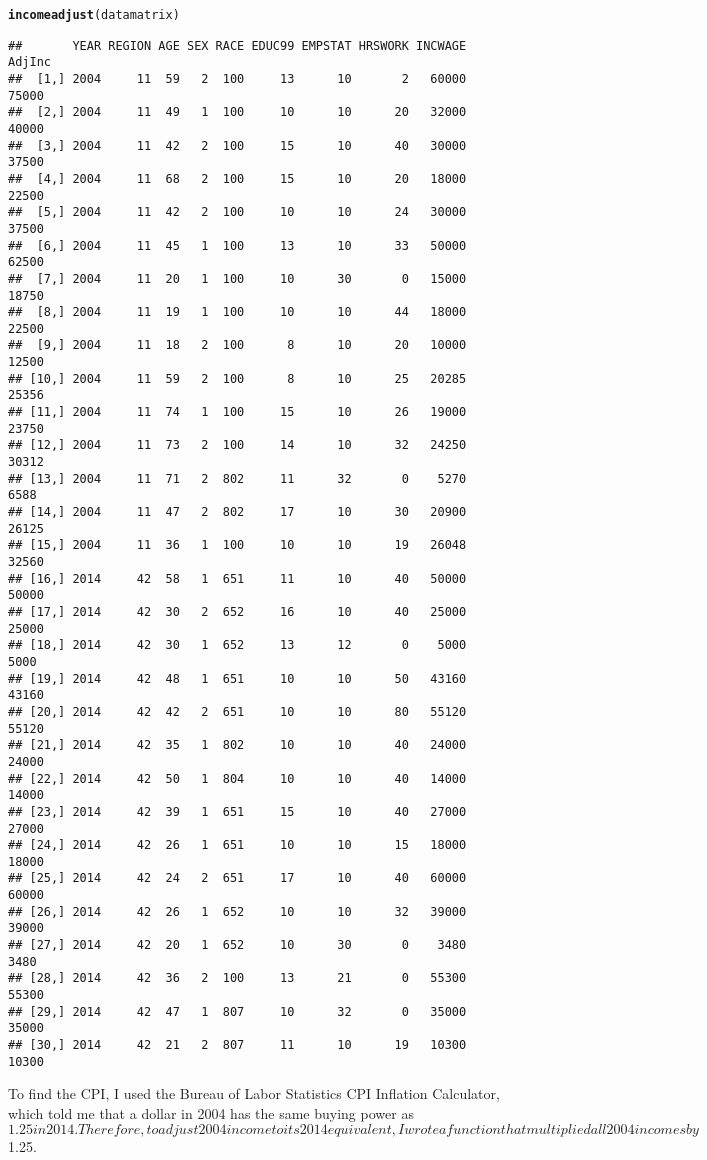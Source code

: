 \documentclass{article}\usepackage[]{graphicx}\usepackage[]{color}
\makeatletter
\newcommand{\hlstd}[1]{\textcolor[rgb]{0.345,0.345,0.345}{#1}}%
\newcommand{\hlkwd}[1]{\textcolor[rgb]{0.737,0.353,0.396}{\textbf{#1}}}%
\newenvironment{kframe}{%
 \def\at@end@of@kframe{}%
 \ifinner\ifhmode%
  \def\at@end@of@kframe{\end{minipage}}%
  \begin{minipage}{\columnwidth}%
 \fi\fi%
 \def\FrameCommand##1{\hskip\@totalleftmargin \hskip-\fboxsep
 \colorbox{shadecolor}{##1}\hskip-\fboxsep
     \hskip-\linewidth \hskip-\@totalleftmargin \hskip\columnwidth}%
 \MakeFramed {\advance\hsize-\width
   \@totalleftmargin\z@ \linewidth\hsize
   \@setminipage}}%
 {\par\unskip\endMakeFramed%
 \at@end@of@kframe}
\newenvironment{knitrout}{}{} %
\makeatother
\begin{document}
\begin{knitrout}
\begin{kframe}
\begin{alltt}
\hlkwd{incomeadjust}\hlstd{(datamatrix)}
\end{alltt}
\begin{verbatim}
##       YEAR REGION AGE SEX RACE EDUC99 EMPSTAT HRSWORK INCWAGE AdjInc
##  [1,] 2004     11  59   2  100     13      10       2   60000  75000
##  [2,] 2004     11  49   1  100     10      10      20   32000  40000
##  [3,] 2004     11  42   2  100     15      10      40   30000  37500
##  [4,] 2004     11  68   2  100     15      10      20   18000  22500
##  [5,] 2004     11  42   2  100     10      10      24   30000  37500
##  [6,] 2004     11  45   1  100     13      10      33   50000  62500
##  [7,] 2004     11  20   1  100     10      30       0   15000  18750
##  [8,] 2004     11  19   1  100     10      10      44   18000  22500
##  [9,] 2004     11  18   2  100      8      10      20   10000  12500
## [10,] 2004     11  59   2  100      8      10      25   20285  25356
## [11,] 2004     11  74   1  100     15      10      26   19000  23750
## [12,] 2004     11  73   2  100     14      10      32   24250  30312
## [13,] 2004     11  71   2  802     11      32       0    5270   6588
## [14,] 2004     11  47   2  802     17      10      30   20900  26125
## [15,] 2004     11  36   1  100     10      10      19   26048  32560
## [16,] 2014     42  58   1  651     11      10      40   50000  50000
## [17,] 2014     42  30   2  652     16      10      40   25000  25000
## [18,] 2014     42  30   1  652     13      12       0    5000   5000
## [19,] 2014     42  48   1  651     10      10      50   43160  43160
## [20,] 2014     42  42   2  651     10      10      80   55120  55120
## [21,] 2014     42  35   1  802     10      10      40   24000  24000
## [22,] 2014     42  50   1  804     10      10      40   14000  14000
## [23,] 2014     42  39   1  651     15      10      40   27000  27000
## [24,] 2014     42  26   1  651     10      10      15   18000  18000
## [25,] 2014     42  24   2  651     17      10      40   60000  60000
## [26,] 2014     42  26   1  652     10      10      32   39000  39000
## [27,] 2014     42  20   1  652     10      30       0    3480   3480
## [28,] 2014     42  36   2  100     13      21       0   55300  55300
## [29,] 2014     42  47   1  807     10      32       0   35000  35000
## [30,] 2014     42  21   2  807     11      10      19   10300  10300
\end{verbatim}
\end{kframe}
\end{knitrout}

To find the CPI, I used the Bureau of Labor Statistics CPI Inflation Calculator, which told me that a dollar in 2004 has the same buying power as $1.25 in 2014. Therefore, to adjust 2004 income to its 2014 equivalent, I wrote a function that multiplied all 2004 incomes by $1.25.
\end{document}
